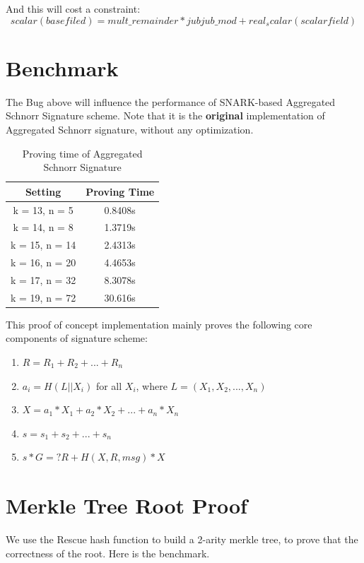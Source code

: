 \documentclass{article}
\begin{document}
And this will cost a constraint:
\[
scalar(base filed) = mult\_remainder * jubjub\_mod + real_scalar(scalar field)
\]

\section{Benchmark}

The Bug above will influence the performance of SNARK-based Aggregated Schnorr Signature scheme. Note that it is the \textbf{original} implementation of Aggregated Schnorr signature, without any optimization.

\begin{table}[H]
    \centering
    \begin{tabular}{c|c} \hline
        Setting & Proving Time \\ \hline
         k = 13, n = 5& 0.8408s  \\ \hline
         k = 14, n = 8& 1.3719s \\ \hline
         k = 15, n = 14& 2.4313s \\ \hline
         k = 16, n = 20& 4.4653s \\ \hline
         k = 17, n = 32& 8.3078s \\ \hline
         k = 19, n = 72& 30.616s \\ \hline
    \end{tabular}
    \caption{Proving time of Aggregated Schnorr Signature}
    \label{tab:my_label}
\end{table}


This proof of concept implementation mainly proves the following core components of signature scheme:
\begin{enumerate}
    \item $R = R_1 + R_2 + ... + R_n$
    \item $a_i = H(L || X_i)$ for all $X_i$, where $L = (X_1, X_2, ... , X_n)$
    \item $X = a_1*X_1 + a_2*X_2 +...+ a_n*X_n$
    \item $s = s_1 + s_2 + ... + s_n$
    \item $s*G =? R+H(X, R, msg)*X$
\end{enumerate}


\section{Merkle Tree Root Proof}

We use the Rescue hash function to build a 2-arity merkle tree, to prove that the correctness of the root. Here is the benchmark.
\end{document}
